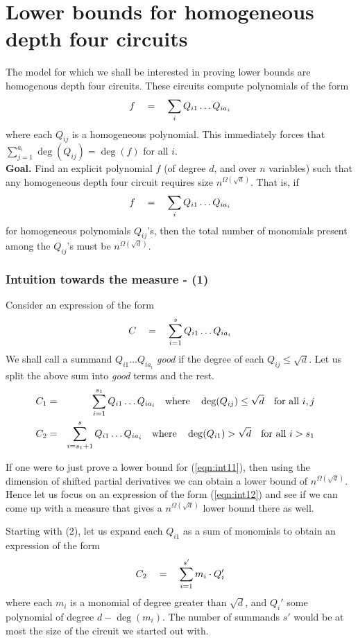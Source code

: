\chapter{Lower bounds for homogeneous depth four circuits}

The model for which we shall be interested in proving lower bounds are homogenous depth four circuits. 
These circuits compute polynomials of the form
\[
f \quad = \quad \sum_{i} Q_{i1}\dots Q_{ia_i}
\]
where each $Q_{ij}$ is a homogeneous polynomial. 
This immediately forces that $\sum_{j=1}^{a_i} \deg(Q_{ij}) = \deg(f)$ for all $i$. \\

{\bf Goal. } Find an explicit polynomial $f$ (of degree $d$, and over $n$ variables) such that any homogeneous depth four circuit requires size $n^{\Omega(\sqrt{d})}$. 
That is, if
\[
f \quad = \quad \sum_{i} Q_{i1}\dots Q_{ia_i}
\]
for homogeneous polynomials $Q_{ij}$'s, then the total number of monomials present among the $Q_{ij}$'s must be $n^{\Omega(\sqrt{d})}$. 

\subsection*{Intuition towards the measure - (1)}

Consider an expression of the form
\[
C \quad = \quad \sum_{i=1}^s Q_{i1}\dots Q_{ia_i}
\]
We shall call a summand $Q_{i1}\dots Q_{ia_i}$ \emph{good} if the degree of each $Q_{ij} \leq \sqrt{d}$. 
Let us split the above sum into \emph{good} terms and the rest. 
\begin{eqnarray}
C_1 &=& \sum_{i=1}^{s_1} Q_{i1}\dots Q_{ia_i} \quad \text{where} \quad \deg(Q_{ij}) \leq \sqrt{d} \quad \text{for all $i,j$} \quad\label{eqn:int11}\\
C_2 &=& \sum_{i=s_1+1}^{s} Q_{i1}\dots Q_{ia_i} \quad \text{where} \quad \deg(Q_{i1}) > \sqrt{d} \quad \text{for all $i > s_1$} \quad\label{eqn:int12}
\end{eqnarray}

If one were to just prove a lower bound for (\ref{eqn:int11}), then using the dimension of shifted partial derivatives we can obtain a lower bound of $n^{\Omega(\sqrt{d})}$. 
Hence let us focus on an expression of the form (\ref{eqn:int12}) and see if we can come up with a measure that gives a $n^{\Omega(\sqrt{d})}$ lower bound there as well. 

Starting with (2), let us expand each $Q_{i1}$ as a sum of monomials to obtain an expression of the form
\[
C_2 \quad = \quad \sum_{i=1}^{s'} m_i\cdot  Q_i'
\]
where each $m_i$ is a monomial of degree greater than $\sqrt{d}$, and $Q_i'$ some polynomial of degree $d - \deg(m_i)$. 
The number of summands $s'$ would be at most the size of the circuit we started out with.\\


